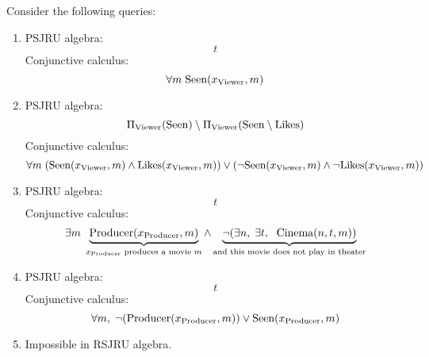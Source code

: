 \documentclass{../../cs-classes/cs-classes}
\newcommand*{\cinema}{\textnormal{Cinema}}
\newcommand*{\seen}{\textnormal{Seen}}
\newcommand*{\likes}{\textnormal{Likes}}
\newcommand*{\producer}{\textnormal{Producer}}
\newcommand*{\viewer}{\textnormal{Viewer}}
\begin{document}
\begin{exercise}
    Consider the following queries:
  \begin{enumerate}
    \item PSJRU algebra:
    \begin{equation*}
        t
    \end{equation*}
    Conjunctive calculus:
    \begin{equation*}
        \forall m \; \seen(x_{\viewer}, m)
    \end{equation*}
    
    \item PSJRU algebra:
    \begin{equation*}
        \Pi_{\viewer}(\seen)\setminus\Pi_{\viewer}(\seen\setminus\likes)
    \end{equation*}
    Conjunctive calculus:
    \begin{equation*}
        \forall m \; (\seen(x_{\viewer}, m)\land \likes(x_{\viewer}, m)) \lor (\lnot \seen(x_{\viewer}, m) \land \lnot \likes(x_{\viewer}, m))
    \end{equation*}
    
    \item PSJRU algebra:
    \begin{equation*}
        t
    \end{equation*}
    Conjunctive calculus:
    \begin{equation*}
        \exists m \; \underbrace{\producer(x_{\producer}, m)}_{x_{\producer} \textnormal{ produces a movie } m} \land \underbrace{\lnot(\exists n, \; \exists t, \; \cinema(n, t, m))}_{\textnormal{and this movie does not play in theater}}
    \end{equation*}
    
    \item PSJRU algebra:
    \begin{equation*}
        t
    \end{equation*}
    Conjunctive calculus:
    \begin{equation*}
        \forall m, \; \lnot(\producer(x_{\producer}, m)) \lor \seen(x_{\producer}, m)
    \end{equation*}
    
    \item Impossible in RSJRU algebra.

  \end{enumerate}  
\end{exercise}
\end{document}
